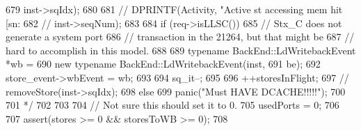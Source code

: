 \begin{DoxyCode}
{{{{679                         inst->sqIdx);
680 
681 //                DPRINTF(Activity, "Active st accessing mem hit [sn:%
682 //                        inst->seqNum);
683 
684                 if (req->isLLSC()) {
685                     // Stx_C does not generate a system port
686                     // transaction in the 21264, but that might be
687                     // hard to accomplish in this model.
688 
689                     typename BackEnd::LdWritebackEvent *wb =
690                         new typename BackEnd::LdWritebackEvent(inst,
691                                                                be);
692                     store_event->wbEvent = wb;
693                 }
694                 sq_it--;
695             }
696             ++storesInFlight;
697 //            removeStore(inst->sqIdx);
698         } else {
699             panic("Must HAVE DCACHE!!!!!\n");
700         }
701 */
702     }
703 
704     // Not sure this should set it to 0.
705     usedPorts = 0;
706 
707     assert(stores >= 0 && storesToWB >= 0);
708 }
\end{DoxyCode}


